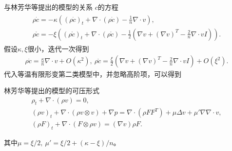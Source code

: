 \documentclass[mathserif]{beamer}
\begin{document}
\begin{frame}{与林芳华等提出的模型的关系}
\pause
$c$的方程
\begin{eqnarray*}
\begin{smallmatrix}
    \rho \dot{c} = - \kappa\left( (\rho \dot{c})_t + \nabla \cdot (\rho \dot{c}) - \frac{1}{n} \nabla \cdot v\right), \\
    \rho \mathring{c} = - \xi \left( (\rho \mathring{c})_t + \nabla \cdot (\rho \mathring{c}) -  \frac{1}{2} (\nabla v + (\nabla v)^T  - \frac{2}{n} \nabla \cdot v I) \right).
\end{smallmatrix}
\end{eqnarray*}
\pause
假设$\kappa,\xi$很小，迭代一次得到
\pause
\begin{equation*}
\begin{smallmatrix}
    \rho \dot{c} = \frac{\kappa}{n} \nabla \cdot v + O(\kappa^2), \ \rho \mathring{c} =  \frac{\xi}{2} (\nabla v + (\nabla v)^T  - \frac{2}{n} \nabla \cdot v I) + O(\xi^2).
\end{smallmatrix}
\end{equation*}
\pause
代入等温有限形变第二类模型中，并忽略高阶项，可以得到
\pause
\begin{block}{林芳华等提出的模型的可压形式}
\begin{subequations}%
  \begin{align*}
  \rho_t + \nabla \cdot (\rho  v ) = 0, \\
  (\rho  v )_t + \nabla \cdot ( \rho  v  \otimes  v ) + \nabla p = \nabla \cdot (\rho F F^T) + \mu \Delta  v  + \mu' \nabla \nabla \cdot  v , \\
  (\rho F)_t + \nabla \cdot (F \otimes \rho  v ) = (\nabla  v ) \rho F.
\end{align*}
\end{subequations}
\end{block}
其中$\mu = \xi/2,\ \mu'=\xi/2 + (\kappa - \xi)/n$。%
\end{frame}
\end{document}
